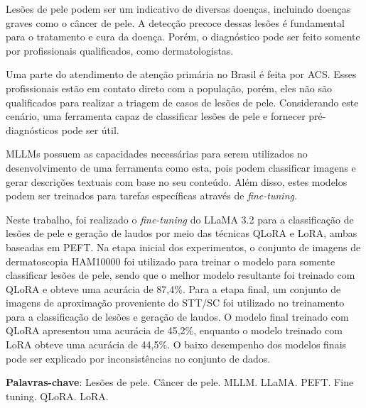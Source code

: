 \imprimircapa

\imprimirfolhaderosto*

\begin{fichacatalografica}
	
\end{fichacatalografica}





\setlength{\absparsep}{18pt}
\begin{resumo}
	\SingleSpacing
	Lesões de pele podem ser um indicativo de diversas doenças, incluindo doenças graves como o câncer de pele. A detecção precoce dessas lesões é fundamental para o
	tratamento e cura da doença. Porém, o diagnóstico pode ser feito somente por profissionais qualificados, como dermatologistas.

	Uma parte do atendimento de atenção primária no Brasil é feita por \ac{ACS}. Esses profissionais estão em contato direto com a população, porém, eles não são
	qualificados para realizar a triagem de casos de lesões de pele. Considerando este cenário, uma ferramenta capaz de classificar lesões de pele e fornecer
	pré-diagnósticos pode ser útil.

	\acp{MLLM} possuem as capacidades necessárias para serem utilizados no desenvolvimento de uma ferramenta como esta, pois podem classificar imagens e gerar descrições
	textuais com base no seu conteúdo. Além disso, estes modelos podem ser treinados para tarefas específicas através de \textit{fine-tuning}.

	Neste trabalho, foi realizado o \textit{fine-tuning} do \ac{LLaMA} 3.2 para a classificação de lesões de pele e geração de laudos por meio das técnicas \ac{QLoRA} e
	\ac{LoRA}, ambas baseadas em \ac{PEFT}. Na etapa inicial dos experimentos, o conjunto de imagens de dermatoscopia \ac{HAM10000} foi utilizado para treinar o modelo
	para somente classificar lesões de pele, sendo que o melhor modelo resultante foi treinado com \ac{QLoRA} e obteve uma acurácia de 87,4\%. Para a etapa final,
	um conjunto de imagens de aproximação proveniente do \ac{STT/SC} foi utilizado no treinamento para a classificação de lesões e geração de laudos. O modelo final
	treinado com \ac{QLoRA} apresentou uma acurácia de 45,2\%, enquanto o modelo treinado com \ac{LoRA} obteve uma acurácia de 44,5\%. O baixo desempenho dos modelos finais
	pode ser explicado por inconsistências no conjunto de dados.

	\textbf{Palavras-chave}: Lesões de pele. Câncer de pele. MLLM. LLaMA. PEFT. Fine tuning. QLoRA. LoRA.
\end{resumo}


